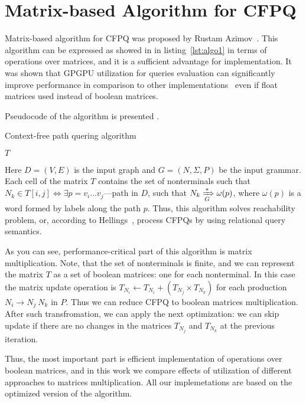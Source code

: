 \section{Matrix-based Algorithm for CFPQ}

Matrix-based algorithm for CFPQ was proposed by Rustam Azimov~\cite{Azimov:2018:CPQ:3210259.3210264}.
This algorithm can be expressed as showed in in listing~\ref{lst:algo1} in terms of operations over matrices, and it is a sufficient advantage for implementation.
It was shown that GPGPU utilization for queries evaluation can significantly improve performance in comparison to other implementations~\cite{Azimov:2018:CPQ:3210259.3210264} even if float matrices used instead of boolean matrices.

Pseudocode of the algorithm is presented .


\begin{algorithm}
\begin{algorithmic}[1]
\caption{Context-free path quering algorithm}
\label{lst:algo1}

    \EndFor

    \EndWhile
\State \Return $T$
\EndFunction
\end{algorithmic}
\end{algorithm}

Here $D = (V, E)$ is the input graph and $G = (N,\Sigma,P)$ be the input grammar.
Each cell of the matrix $T$ contains the set of nonterminals such that $N_k \in T[i,j] \iff \exists p = v_i \ldots v_j $---path in $D$, such that $N_k \xRightarrow[G]{*} \omega(p) $, where $\omega(p)$ is a word formed by labels along the path $p$.
Thus, this algorithm solves reachability problem, or, according to Hellings~\cite{hellingsRelational}, process CFPQs by using relational query semantics.

As you can see, performance-critical part of this algorithm is matrix multiplication.
Note, that the set of nonterminals is finite, and we can represent the matrix $T$ as a set of boolean matrices: one for each nonterminal.
In this case the matrix update operation is $T_{N_i} \leftarrow T_{N_i} + (T_{N_j} \times T_{N_k})$ for each production $N_i \rightarrow N_j \ N_k$ in $P$.
Thus we can reduce CFPQ to boolean matrices multiplication.
After such transfromation, we can apply the next optimization: we can skip update if there are no changes in the matrices $T_{N_j}$ and $T_{N_k}$ at the previous iteration.

Thus, the most important part is efficient implementation of operations over boolean matrices, and in this work we compare effects of utilization of different approaches to matrices multiplication.
All our implemetations are based on the optimized version of the algorithm.
